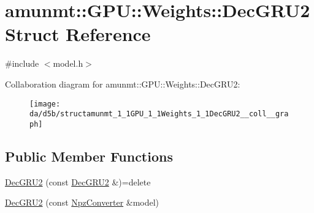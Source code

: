 \hypertarget{structamunmt_1_1GPU_1_1Weights_1_1DecGRU2}{}\section{amunmt\+:\+:G\+PU\+:\+:Weights\+:\+:Dec\+G\+R\+U2 Struct Reference}
\label{structamunmt_1_1GPU_1_1Weights_1_1DecGRU2}


{\ttfamily \#include $<$model.\+h$>$}



Collaboration diagram for amunmt\+:\+:G\+PU\+:\+:Weights\+:\+:Dec\+G\+R\+U2\+:
\nopagebreak
\begin{figure}[H]
\begin{center}
\leavevmode
\texttt{[image: da/d5b/structamunmt\_1\_1GPU\_1\_1Weights\_1\_1DecGRU2\_\_coll\_\_graph]}
\end{center}
\end{figure}
\subsection*{Public Member Functions}
\begin{DoxyCompactItemize}
\item 
\hyperlink{structamunmt_1_1GPU_1_1Weights_1_1DecGRU2_ac3aa71be5e1b2fc4331bf52bfd6d1aae}{Dec\+G\+R\+U2} (const \hyperlink{structamunmt_1_1GPU_1_1Weights_1_1DecGRU2}{Dec\+G\+R\+U2} \&)=delete
\item 
\hyperlink{structamunmt_1_1GPU_1_1Weights_1_1DecGRU2_a19aa91bef5ea40d4e1d2727f33c1b2e3}{Dec\+G\+R\+U2} (const \hyperlink{classamunmt_1_1GPU_1_1NpzConverter}{Npz\+Converter} \&model)
\end{DoxyCompactItemize}

